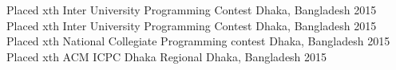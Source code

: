 \begin{cvhonors}
  \cvhonor
    {Placed xth}
    {Inter University Programming Contest}
    {Dhaka, Bangladesh}
    {2015}
  \cvhonor
    {Placed xth}
    {Inter University Programming Contest}
    {Dhaka, Bangladesh}
    {2015}
  \cvhonor
    {Placed xth}
    {National Collegiate Programming contest}
    {Dhaka, Bangladesh}
    {2015}
  \cvhonor
    {Placed xth}
    {ACM ICPC Dhaka Regional}
    {Dhaka, Bangladesh}
    {2015}
\end{cvhonors}
  \vspace{-8mm}
  \begin{cvitems}
    \item { }
    \item { }
    \item { }
    \item { }
  \end{cvitems}
